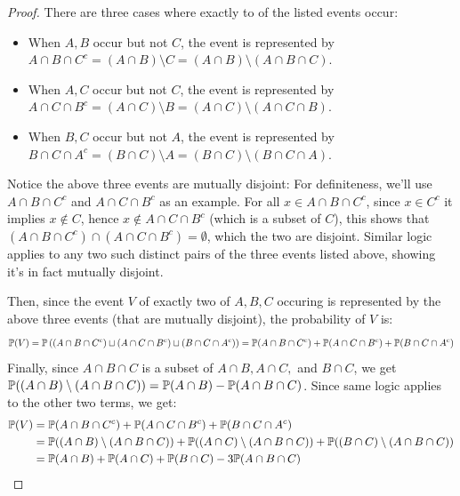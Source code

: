\documentclass{article}
\begin{document}
\begin{proof}
    There are three cases where exactly to of the listed events occur:
    \begin{itemize}
        \item When $A,B$ occur but not $C$, the event is represented by $A\cap B\cap C^c = (A\cap B)\setminus C = (A\cap B)\setminus (A\cap B\cap C)$.
        \item When $A,C$ occur but not $C$, the event is represented by $A\cap C\cap B^c = (A\cap C)\setminus B=(A\cap C)\setminus(A\cap C\cap B)$.
        \item When $B,C$ occur but not $A$, the event is represented by $B\cap C\cap A^c = (B\cap C)\setminus A = (B\cap C)\setminus (B\cap C\cap A)$.
    \end{itemize}
    Notice the above three events are mutually disjoint: For definiteness, we'll use $A\cap B\cap C^c$ and $A\cap C\cap B^c$ as an example. For all $x\in A\cap B\cap C^c$, since $x\in C^c$ it implies $x\notin C$, hence $x\notin A\cap C\cap B^c$ (which is a subset of $C$), this shows that $(A\cap B\cap C^c)\cap (A\cap C\cap B^c)=\emptyset$, which the two are disjoint. Similar logic applies to any two such distinct pairs of the three events listed above, showing it's in fact mutually disjoint.

    Then, since the event $V$ of exactly two of $A,B,C$ occuring is represented by the above three events (that are mutually disjoint), the probability of $V$ is:
    \begin{align}
        \mathbb{P}(V)=\mathbb{P}\left((A\cap B\cap C^c)\sqcup (A\cap C\cap B^c)\sqcup (B\cap C\cap A^c)\right) = \mathbb{P}(A\cap B\cap C^c)+\mathbb{P}(A\cap C\cap B^c)+\mathbb{P}(B\cap C\cap A^c)
    \end{align}
    Finally, since $A\cap B\cap C$ is a subset of $A\cap B,A\cap C,$ and $B\cap C$, we get $\mathbb{P}((A\cap B)\setminus (A\cap B\cap C)) = \mathbb{P}(A\cap B)-\mathbb{P}(A\cap B\cap C)$. Since same logic applies to the other two terms, we get:
    \begin{align}
        \mathbb{P}(V)&= \mathbb{P}(A\cap B\cap C^c)+\mathbb{P}(A\cap C\cap B^c)+\mathbb{P}(B\cap C\cap A^c) \\
        &= \mathbb{P}((A\cap B)\setminus (A\cap B\cap C))+\mathbb{P}((A\cap C)\setminus (A\cap B\cap C))+\mathbb{P}((B\cap C)\setminus (A\cap B\cap C))\\
        &= \mathbb{P}(A\cap B)+\mathbb{P}(A\cap C)+\mathbb{P}(B\cap C)-3\mathbb{P}(A\cap B\cap C)
    \end{align}

\end{proof}
\end{document}
